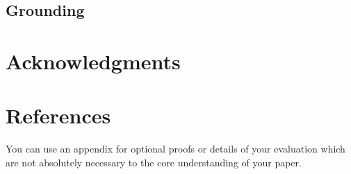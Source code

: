 \documentclass{vldb}
\begin{document}
\subsection{Grounding}


\balance

\section{Acknowledgments}




\section{References}



\begin{appendix}
You can use an appendix for optional proofs or details of your evaluation which are not absolutely necessary to the core understanding of your paper. 
\end{appendix}
\end{document}
